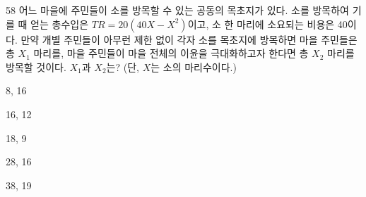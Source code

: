 \begin{question}{58}
어느 마을에 주민들이 소를 방목할 수 있는 공동의 목초지가 있다. 소를 방목하여 기를 때 얻는 총수입은 $TR=20(40X-X^{2})$이고, 소 한 마리에 소요되는 비용은 40이다. 만약 개별 주민들이 아무런 제한 없이 각자 소를 목초지에 방목하면 마을 주민들은 총 $X_{1}$ 마리를, 마을 주민들이 마을 전체의 이윤을 극대화하고자 한다면 총 $X_{2}$ 마리를 방목할 것이다. $X_{1}$과 $X_{2}$는? (단, $X$는 소의 마리수이다.)
\begin{choices}
  \item 8, 16
  \item 16, 12
  \item 18, 9
  \item 28, 16
  \item 38, 19
\end{choices}
\end{question}
